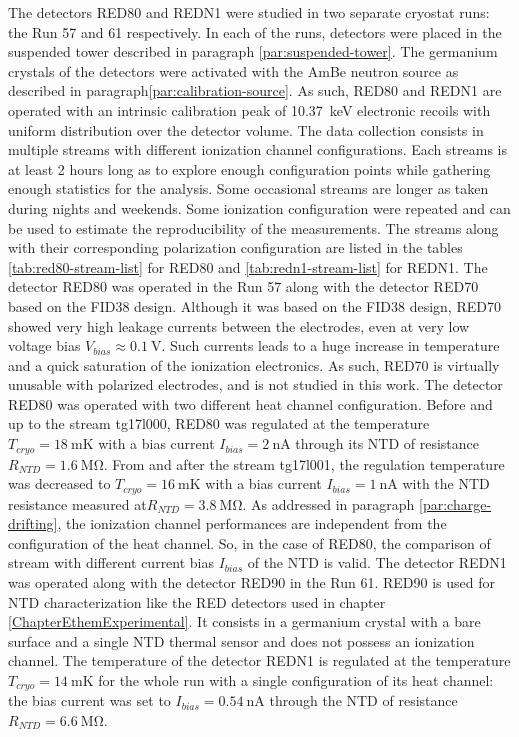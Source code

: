 The detectors RED80 and REDN1 were studied in two separate cryostat runs: the Run 57 and 61 respectively. In each of the runs, detectors were placed in the suspended tower described in paragraph \ref{par:suspended-tower}. The germanium crystals of the detectors were activated with the AmBe neutron source as described in paragraph\ref{par:calibration-source}. As such, RED80 and REDN1 are operated with an intrinsic calibration peak of \SI{10.37}{\kilo\eV} electronic recoils with uniform distribution over the detector volume. The data collection consists in multiple streams with different ionization channel configurations. Each streams is at least 2 hours long as to explore enough configuration points while gathering enough statistics for the analysis. Some occasional streams are longer as taken during nights and weekends. Some ionization configuration were repeated and can be used to estimate the reproducibility of the measurements. The streams along with their corresponding polarization configuration are listed in the tables \ref{tab:red80-stream-list} for RED80 and \ref{tab:redn1-stream-list} for REDN1.
The detector RED80 was operated in the Run 57 along with the detector RED70 based on the FID38 design. Although it was based on the FID38 design, RED70 showed very high leakage currents between the electrodes, even at very low voltage bias $V_{bias} \approx \SI{0.1}{\volt}$. Such currents leads to a huge increase in temperature and a quick saturation of the ionization electronics. As such, RED70 is virtually unusable with polarized electrodes, and is not studied in this work. The detector RED80 was operated with two different heat channel configuration. Before and up to the stream tg17l000, RED80 was regulated at the temperature $T_{cryo}=\SI{18}{\milli\kelvin}$ with a bias current $I_{bias} = \SI{2}{\nano\ampere}$ through its NTD of resistance $R_{NTD}=\SI{1.6}{\mega\ohm}$. From and after the stream tg17l001, the regulation temperature was decreased to $T_{cryo}=\SI{16}{\milli\kelvin}$ with a bias current $I_{bias} = \SI{1}{\nano\ampere}$ with the NTD resistance measured at$R_{NTD}=\SI{3.8}{\mega\ohm}$.
As addressed in paragraph \ref{par:charge-drifting}, the ionization channel performances are independent from the configuration of the heat channel. So, in the case of RED80, the comparison of stream with different current bias $I_{bias}$ of the NTD is valid.
The detector REDN1 was operated along with the detector RED90 in the Run 61. RED90 is used for NTD characterization like the RED detectors used in chapter \ref{ChapterEthemExperimental}. It consists in a germanium crystal with a bare surface and a single NTD thermal sensor and does not possess an ionization channel.
The temperature of the detector REDN1 is regulated at the temperature $T_{cryo}=\SI{14}{\milli\kelvin}$ for the whole run with a single configuration of its heat channel: the bias current was set to $I_{bias}=\SI{0.54}{\nano\ampere}$ through the NTD of resistance $R_{NTD} = \SI{6.6}{\mega\ohm}$.

